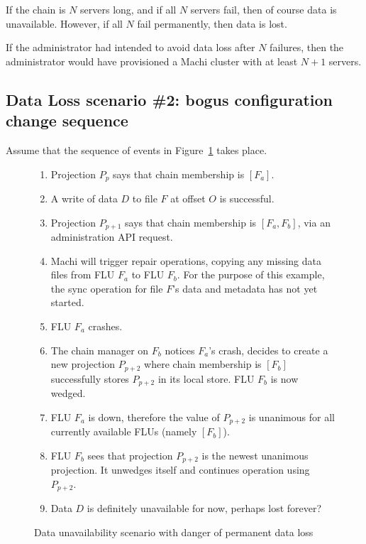 \documentclass[preprint,10pt]{sigplanconf}
\begin{document}
If the chain is $N$ servers long, and if all $N$ servers fail, then
of course data is unavailable.  However, if all $N$ fail
permanently, then data is lost.

If the administrator had intended to avoid data loss after $N$
failures, then the administrator would have provisioned a Machi
cluster with at least $N+1$ servers.

\subsection{Data Loss scenario \#2: bogus configuration change sequence}
\label{sub:data-loss2}

Assume that the sequence of events in Figure~\ref{fig:data-loss2} takes place.

\begin{figure}
\begin{enumerate}
\item Projection $P_p$ says that chain membership is $[F_a]$.
\item A write of data $D$ to file $F$ at offset $O$ is successful.
\item Projection $P_{p+1}$ says that chain membership is $[F_a,F_b]$, via
   an administration API request.
\item Machi will trigger repair operations, copying any missing data
   files from FLU $F_a$ to FLU $F_b$.  For the purpose of this
   example, the sync operation for file $F$'s data and metadata has
   not yet started.
\item FLU $F_a$ crashes.
\item The chain manager on $F_b$ notices $F_a$'s crash, 
   decides to create a new projection $P_{p+2}$ where chain membership is
   $[F_b]$
  successfully stores $P_{p+2}$ in its local store.  FLU $F_b$ is now wedged.
\item FLU $F_a$ is down, therefore the
   value of $P_{p+2}$ is unanimous for all currently available FLUs
   (namely $[F_b]$).
\item FLU $F_b$ sees that projection $P_{p+2}$ is the newest unanimous
   projection.  It unwedges itself and continues operation using $P_{p+2}$.
\item Data $D$ is definitely unavailable for now, perhaps lost forever?
\end{enumerate}
\caption{Data unavailability scenario with danger of permanent data loss}
\label{fig:data-loss2}
\end{figure}
\end{document}

